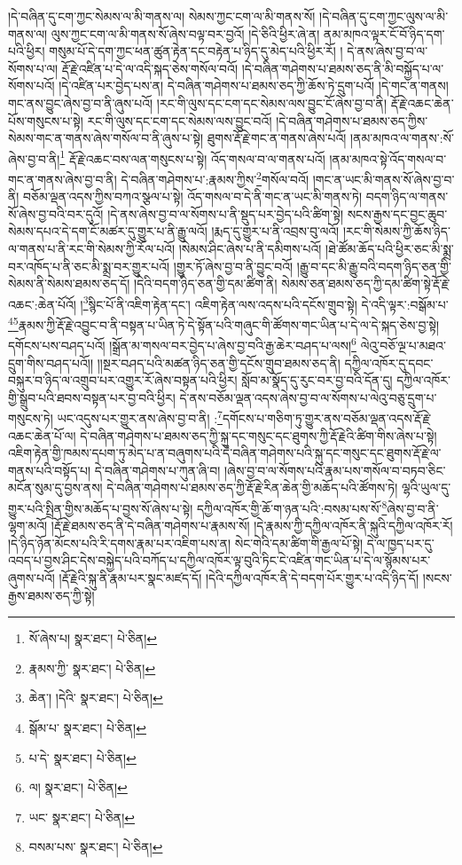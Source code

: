 །དེ་བཞིན་དུ་ངག་ཀྱང་སེམས་ལ་མི་གནས་ལ། སེམས་ཀྱང་ངག་ལ་མི་གནས་སོ། །དེ་བཞིན་དུ་ངག་ཀྱང་ལུས་ལ་མི་གནས་ལ། ལུས་ཀྱང་ངག་ལ་མི་གནས་སོ་ཞེས་བལྟ་བར་བྱའོ། །དེ་ཅིའི་ཕྱིར་ཞེ་ན། ནམ་མཁའ་ལྟར་ངོ་བོ་ཉིད་དག་པའི་ཕྱིར། གསུམ་པོ་དེ་དག་ཀྱང་ཕན་ཚུན་རྟེན་དང་བརྟེན་པ་ཉིད་དུ་མེད་པའི་ཕྱིར་རོ། །
དེ་ནས་ཞེས་བྱ་བ་ལ་སོགས་པ་ལ། རྡོ་རྗེ་འཛིན་པ་དེ་ལ་འདི་སྐད་ཅེས་གསོལ་བའོ། །དེ་བཞིན་གཤེགས་པ་ཐམས་ཅད་ནི་མི་བསྐྱོད་པ་ལ་སོགས་པའོ། །དེ་འཛིན་པར་བྱེད་པས་ན། དེ་བཞིན་གཤེགས་པ་ཐམས་ཅད་ཀྱི་ཆོས་ཏེ་དྲུག་པའོ། །དེ་གང་ན་གནས། གང་ནས་བྱུང་ཞེས་བྱ་བ་ནི་ཞུས་པའོ། །རང་གི་ལུས་དང་ངག་དང་སེམས་ལས་བྱུང་ངོ་ཞེས་བྱ་བ་ནི། རྡོ་རྗེ་འཆང་ཆེན་པོས་གསུངས་པ་སྟེ། རང་གི་ལུས་དང་ངག་དང་སེམས་ལས་བྱུང་བའོ། །དེ་བཞིན་གཤེགས་པ་ཐམས་ཅད་ཀྱིས་སེམས་གང་ན་གནས་ཞེས་གསོལ་བ་ནི་ཞུས་པ་སྟེ། ཐུགས་རྡོ་རྗེ་གང་ན་གནས་ཞེས་པའོ། །ནམ་མཁའ་ལ་གནས་:སོ་ཞེས་བྱ་བ་ནི།\footnote{སོ་ཞེས་པ།  སྣར་ཐང་།  པེ་ཅིན། } རྡོ་རྗེ་འཆང་བས་ལན་གསུངས་པ་སྟེ། འོད་གསལ་བ་ལ་གནས་པའོ། །ནམ་མཁའ་སྟེ་འོད་གསལ་བ་གང་ན་གནས་ཞེས་བྱ་བ་ནི། དེ་བཞིན་གཤེགས་པ་:རྣམས་ཀྱིས་\footnote{རྣམས་ཀྱི་  སྣར་ཐང་།  པེ་ཅིན། }གསོལ་བའོ། །གང་ན་ཡང་མི་གནས་སོ་ཞེས་བྱ་བ་ནི། བཅོམ་ལྡན་འདས་ཀྱིས་བཀའ་སྩལ་པ་སྟེ། འོད་གསལ་བ་དེ་ནི་གང་ན་ཡང་མི་གནས་ཏེ། བདག་ཉིད་ལ་གནས་སོ་ཞེས་བྱ་བའི་བར་དུའོ། །དེ་ནས་ཞེས་བྱ་བ་ལ་སོགས་པ་ནི་སྡུད་པར་བྱེད་པའི་ཚིག་སྟེ། སངས་རྒྱས་དང་བྱང་ཆུབ་སེམས་དཔའ་དེ་དག་ངོ་མཚར་དུ་གྱུར་པ་ནི་རྒྱུ་ལའོ། །རྨད་དུ་གྱུར་པ་ནི་འབྲས་བུ་ལའོ། །རང་གི་སེམས་ཀྱི་ཆོས་ཉིད་ལ་གནས་པ་ནི་རང་གི་སེམས་ཀྱི་རོལ་པའོ། །སེམས་ཤིང་ཞེས་པ་ནི་དམིགས་པའོ། །ཐེ་ཚོམ་ཆོད་པའི་ཕྱིར་ཅང་མི་སྨྲ་བར་འཁོད་པ་ནི་ཅང་མི་སྨྲ་བར་གྱུར་པའོ། །གྱུར་ཏོ་ཞེས་བྱ་བ་ནི་བྱུང་བའོ། །རྒྱུ་བ་དང་མི་རྒྱུ་བའི་བདག་ཉིད་ཅན་གྱི་སེམས་ནི་སེམས་ཐམས་ཅད་དོ། །དེའི་བདག་ཉིད་ཅན་གྱི་དམ་ཚིག་ནི། སེམས་ཅན་ཐམས་ཅད་ཀྱི་དམ་ཚིག་སྟེ་རྡོ་རྗེ་འཆང་:ཆེན་པོའོ། །\footnote{ཆེན་། །དེའི་  སྣར་ཐང་།  པེ་ཅིན། }སྙིང་པོ་ནི་འཇིག་རྟེན་དང་། འཇིག་རྟེན་ལས་འདས་པའི་དངོས་གྲུབ་སྟེ། དེ་འདི་ལྟར་:བསྒོམ་པ་\footnote{སྒོམ་པ་  སྣར་ཐང་།  པེ་ཅིན། }\footnote{པ་དེ་  སྣར་ཐང་།  པེ་ཅིན། }རྣམས་ཀྱི་རྡོ་རྗེ་འབྱུང་བ་ནི་བསྟན་པ་ཡིན་ཏེ་དེ་སྟོན་པའི་གཞུང་གི་ཚོགས་གང་ཡིན་པ་དེ་ལ་དེ་སྐད་ཅེས་བྱ་སྟེ། དགོངས་པས་བཤད་པའོ། །སྒྲོན་མ་གསལ་བར་བྱེད་པ་ཞེས་བྱ་བའི་རྒྱ་ཆེར་བཤད་པ་ལས།\footnote{ལ།  སྣར་ཐང་།  པེ་ཅིན། } ལེའུ་བཅོ་ལྔ་པ་མཐའ་དྲུག་གིས་བཤད་པའོ།། །།སྔར་བཤད་པའི་མཚན་ཉིད་ཅན་གྱི་དངོས་གྲུབ་ཐམས་ཅད་ནི། དཀྱིལ་འཁོར་དུ་དབང་བསྐུར་བ་ཉིད་ལ་འགྲུབ་པར་འགྱུར་རོ་ཞེས་བསྟན་པའི་ཕྱིར། སློབ་མ་སྣོད་དུ་རུང་བར་བྱ་བའི་དོན་དུ། དཀྱིལ་འཁོར་གྱི་སྒྲུབ་པའི་ཐབས་བསྟན་པར་བྱ་བའི་ཕྱིར། དེ་ནས་བཅོམ་ལྡན་འདས་ཞེས་བྱ་བ་ལ་སོགས་པ་ལེའུ་བཅུ་དྲུག་པ་གསུངས་ཏེ། ཡང་འདུས་པར་གྱུར་ནས་ཞེས་བྱ་བ་ནི། :\footnote{ཡང་  སྣར་ཐང་།  པེ་ཅིན། }དགོངས་པ་གཅིག་ཏུ་གྱུར་ནས་བཅོམ་ལྡན་འདས་རྡོ་རྗེ་འཆང་ཆེན་པོ་ལ། དེ་བཞིན་གཤེགས་པ་ཐམས་ཅད་ཀྱི་སྐུ་དང་གསུང་དང་ཐུགས་ཀྱི་རྡོ་རྗེའི་ཚིག་གིས་ཞེས་པ་སྟེ། འཇིག་རྟེན་གྱི་ཁམས་དཔག་ཏུ་མེད་པ་ན་བཞུགས་པའི་དེ་བཞིན་གཤེགས་པའི་སྐུ་དང་གསུང་དང་ཐུགས་རྡོ་རྗེ་ལ་གནས་པའི་བསྟོད་པ། དེ་བཞིན་གཤེགས་པ་ཀུན་ཞི་བ། །ཞེས་བྱ་བ་ལ་སོགས་པའི་རྣམ་པས་གསོལ་བ་བཏབ་ཅིང་མངོན་སུམ་དུ་བྱས་ནས། དེ་བཞིན་གཤེགས་པ་ཐམས་ཅད་ཀྱི་རྡོ་རྗེ་རིན་ཆེན་གྱི་མཆོད་པའི་ཚོགས་ཏེ། ལྷའི་ཡུལ་དུ་གྱུར་པའི་སྤྲིན་གྱིས་མཆོད་པ་བྱས་སོ་ཞེས་པ་སྟེ། དཀྱིལ་འཁོར་གྱི་ཆོ་ག་ཉན་པའི་:བསམ་པས་སོ་\footnote{བསམ་པས་  སྣར་ཐང་།  པེ་ཅིན། }ཞེས་བྱ་བ་ནི་ལྷག་མའོ། །རྡོ་རྗེ་ཐམས་ཅད་ནི་དེ་བཞིན་གཤེགས་པ་རྣམས་སོ། །དེ་རྣམས་ཀྱི་དཀྱིལ་འཁོར་ནི་སྐུའི་དཀྱིལ་འཁོར་རོ། །དེ་ཉིད་ཉོན་མོངས་པའི་རི་དགས་རྣམ་པར་འཇིག་པས་ན། སེང་གེའི་དམ་ཚིག་གི་རྒྱལ་པོ་སྟེ། དེ་ལ་ཁྱད་པར་དུ་འབད་པ་བྱས་ཤིང་དེས་བསྐྱེད་པའི་བཀོད་པ་དཀྱིལ་འཁོར་ལྟ་བུའི་ཏིང་ངེ་འཛིན་གང་ཡིན་པ་དེ་ལ་སྙོམས་པར་ཞུགས་པའོ། །རྡོ་རྗེའི་སྐུ་ནི་རྣམ་པར་སྣང་མཛད་དོ། །དེའི་དཀྱིལ་འཁོར་ནི་དེ་བདག་པོར་གྱུར་པ་འདི་ཉིད་དོ། །སངས་རྒྱས་ཐམས་ཅད་ཀྱི་སྟེ། 